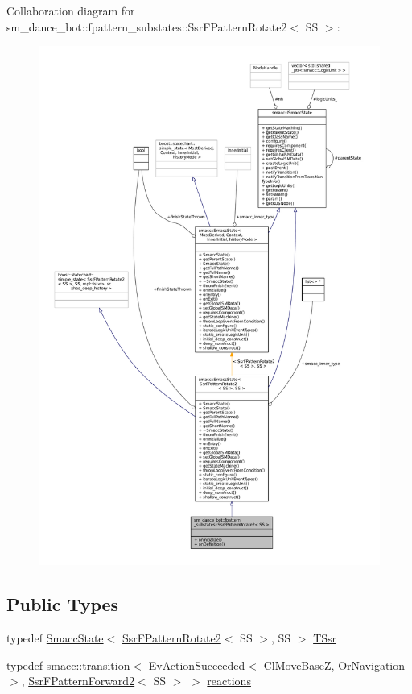 Collaboration diagram for sm\+\_\+dance\+\_\+bot\+:\+:fpattern\+\_\+substates\+:\+:Ssr\+F\+Pattern\+Rotate2$<$ SS $>$\+:
\nopagebreak
\begin{figure}[H]
\begin{center}
\leavevmode
\includegraphics[width=350pt]{structsm__dance__bot_1_1fpattern__substates_1_1SsrFPatternRotate2__coll__graph}
\end{center}
\end{figure}
\subsection*{Public Types}
\begin{DoxyCompactItemize}
\item 
typedef \hyperlink{classSmaccState}{Smacc\+State}$<$ \hyperlink{structsm__dance__bot_1_1fpattern__substates_1_1SsrFPatternRotate2}{Ssr\+F\+Pattern\+Rotate2}$<$ SS $>$, SS $>$ \hyperlink{structsm__dance__bot_1_1fpattern__substates_1_1SsrFPatternRotate2_aa62bec69230573c885a76fafba728377}{T\+Ssr}
\item 
typedef \hyperlink{classsmacc_1_1transition}{smacc\+::transition}$<$ Ev\+Action\+Succeeded$<$ \hyperlink{classmove__base__z__client_1_1ClMoveBaseZ}{Cl\+Move\+BaseZ}, \hyperlink{classsm__dance__bot_1_1OrNavigation}{Or\+Navigation} $>$, \hyperlink{structsm__dance__bot_1_1fpattern__substates_1_1SsrFPatternForward2}{Ssr\+F\+Pattern\+Forward2}$<$ SS $>$ $>$ \hyperlink{structsm__dance__bot_1_1fpattern__substates_1_1SsrFPatternRotate2_a66267747e1f4c79d8b9d1b3383c5d019}{reactions}
\end{DoxyCompactItemize}

